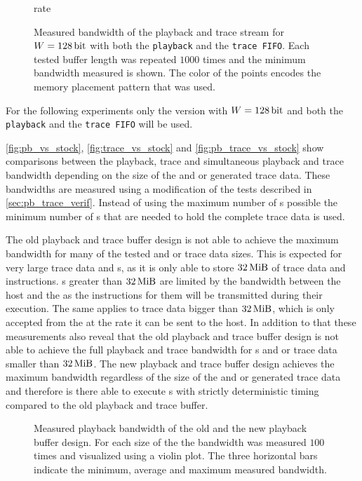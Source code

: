 \begin{figure}[H]
\caption{rate}
\caption{Measured bandwidth of the playback and trace stream for $W = \SI{128}{\bit}$ with both the \texttt{playback} and the \texttt{trace FIFO}. Each tested buffer length was repeated $\num{1000}$ times and the minimum bandwidth measured is shown. The color of the points encodes the memory placement pattern that was used.}\label{fig:pb_trace_128_both_fifo}
\end{figure}

For the following experiments only the version with $W = \SI{128}{\bit}$ and both the \texttt{playback} and the \texttt{trace FIFO} will be used.

\autoref{fig:pb_vs_stock}, \autoref{fig:trace_vs_stock} and \autoref{fig:pb_trace_vs_stock} show comparisons between the playback, trace and simultaneous playback and trace bandwidth depending on the size of the \PlaybackProgram{} and or generated trace data. These bandwidths are measured using a modification of the tests described in \autoref{sec:pb_trace_verif}. Instead of using the maximum number of \descriptor{}s possible the minimum number of \descriptor{}s that are needed to hold the complete \PlaybackProgram{} trace data is used.

The old playback and trace buffer design is not able to achieve the maximum bandwidth for many of the tested \PlaybackProgram{} and or trace data sizes. This is expected for very large trace data and \PlaybackProgram{}s, as it is only able to store $\SI{32}{\mebi\byte}$ of trace data and \PlaybackProgram{} instructions. \PlaybackProgram{}s greater than $\SI{32}{\mebi\byte}$ are limited by the bandwidth between the host and the \FPGA{} as the instructions for them will be transmitted during their execution. The same applies to trace data bigger than $\SI{32}{\mebi\byte}$, which is only accepted from the \pbexec{} at the rate it can be sent to the host.
In addition to that these measurements also reveal that the old playback and trace buffer design is not able to achieve the full playback and trace bandwidth for \PlaybackProgram{}s and or trace data smaller than $\SI{32}{\mebi\byte}$.
The new playback and trace buffer design achieves the maximum bandwidth regardless of the size of the \PlaybackProgram{} and or generated trace data and therefore is there able to execute \PlaybackProgram{}s with strictly deterministic timing compared to the old playback and trace buffer.
\begin{figure}[H]
\caption{Measured playback bandwidth of the old and the new playback buffer design. For each size of the \PlaybackProgram{} the bandwidth was measured $\num{100}$ times and visualized using a violin plot. The three horizontal bars indicate the minimum, average and maximum measured bandwidth.}\label{fig:pb_vs_stock}
\end{figure}

